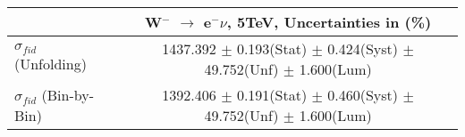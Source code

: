 \documentclass[12pt]{article}
\begin{document}
\begin{table}[ht]
\begin{tabular}{c|c|}
\cline{2-2}
                                                           &    W$^{-}$ $\rightarrow$ e$^{-} \nu $, 5TeV, Uncertainties in (\%)  \\ \hline 
\multicolumn{1}{|l|}{$\sigma_{fid}$ (Unfolding)}         &    1437.392   $\pm$ 0.193(Stat) $\pm$ 0.424(Syst) $\pm$ 49.752(Unf) $\pm$ 1.600(Lum)     \\ \hline 
\multicolumn{1}{|l|}{$\sigma_{fid}$ (Bin-by-Bin)}        &    1392.406   $\pm$ 0.191(Stat) $\pm$ 0.460(Syst) $\pm$ 49.752(Unf) $\pm$ 1.600(Lum)     \\ \hline 
\end{tabular}
\end{table}
\end{document}
